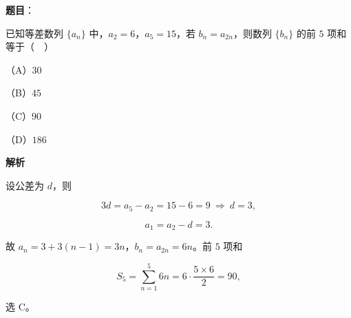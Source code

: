 \begin{answer}

\textbf{题目}：

已知等差数列 $\{a_n\}$ 中，$a_2=6$，$a_5=15$，若 $b_n=a_{2n}$，则数列 $\{b_n\}$ 的前 $5$ 项和等于（　）

（A）$30$

（B）$45$

（C）$90$

（D）$186$

\textbf{解析}

设公差为 $d$，则

\nopagebreak[4]
\[3d=a_5-a_2=15-6=9\ \Longrightarrow\ d=3,\]

\nopagebreak[4]
\[a_1=a_2-d=3 .\]

故 $a_n=3+3(n-1)=3n$，$b_n=a_{2n}=6n$。前 $5$ 项和

\nopagebreak[4]
\[S_5=\sum_{n=1}^{5}6n=6\cdot\frac{5\times6}{2}=90,\]

选 C。


\end{answer}
